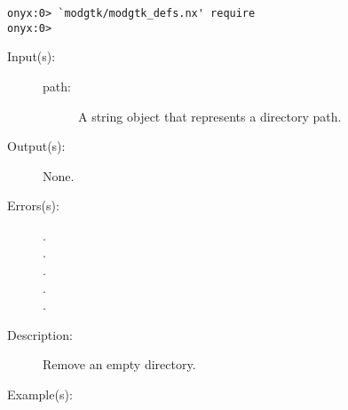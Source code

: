\begin{description}
\begin{description}
\begin{verbatim}
onyx:0> `modgtk/modgtk_defs.nx' require
onyx:0>
	\end{verbatim}
	\end{description}
\label{systemdict:rmdir}
\item[{\onyxop{path}{rmdir}{--}}: ]
	\begin{description}\item[]
	\item[Input(s): ]
		\begin{description}\item[]
		\item[path: ]
			A string object that represents a directory path.
		\end{description}
	\item[Output(s): ] None.
	\item[Errors(s): ]
		\begin{description}\item[]
		\item[.]
		\item[.]
		\item[.]
		\item[.]
		\item[.]
		\end{description}
	\item[Description: ]
		Remove an empty directory.
	\item[Example(s): ]\begin{verbatim}


\end{verbatim}
\end{description}
\end{description}
